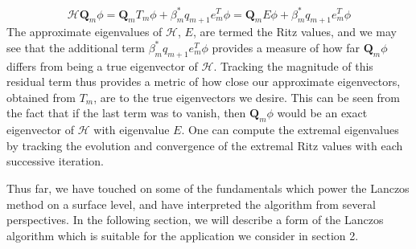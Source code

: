 \documentclass[12pt]{article} %
\begin{document}
\begin{equation}
    \mathcal{H}\textbf{Q}_m \phi = \textbf{Q}_m T_m \phi + \beta^*_m q_{m+1}e^{T}_m \phi = \textbf{Q}_m E \phi + \beta^*_m q_{m+1}e^{T}_m \phi 
\end{equation}
The approximate eigenvalues of $\mathcal{H}$, $E$, are termed the Ritz values, and we may see that the additional term $\beta^*_m q_{m+1}e^T_m \phi$ provides a measure of how far $\textbf{Q}_m \phi$ differs from being a true eigenvector of $\mathcal{H}$. Tracking the magnitude of this residual term thus provides a metric of how close our approximate eigenvectors, obtained from $T_m$, are to the true eigenvectors we desire. This can be seen from the fact that if the last term was to vanish, then $\textbf{Q}_m \phi$ would be an exact eigenvector of $\mathcal{H}$ with eigenvalue $E$. One can compute the extremal eigenvalues by tracking the evolution and convergence of the extremal Ritz values with each successive iteration.

Thus far, we have touched on some of the fundamentals which power the Lanczos method on a surface level, and have interpreted the algorithm from several perspectives. In the following section, we will describe a form of the Lanczos algorithm which is suitable for the application we consider in section 2.
\end{document}
